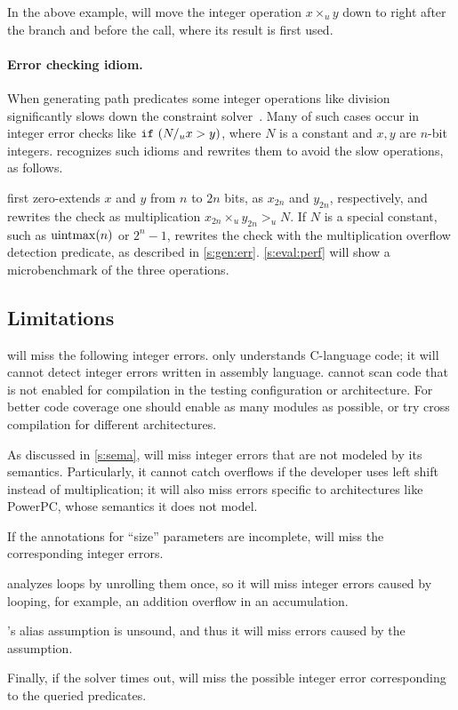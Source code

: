 In the above example, \sys will move the integer operation $x
\times_u y$ down to right after the  branch and before the
 call, where its result  is first used.

\paragraph{Error checking idiom.}

When generating path predicates some integer
operations like division significantly slows down the constraint
solver~\cite{brummayer:perf}.  Many of such cases occur in integer
error checks like $\texttt{if}\ (N /_u x > y)$, where $N$ is a constant
and $x, y$ are $n$-bit integers.  \sys recognizes such idioms and
rewrites them to avoid the slow operations, as follows.

\sys first zero-extends $x$ and $y$ from $n$ to $2n$ bits, as
$x_{2n}$ and $y_{2n}$, respectively, and rewrites the check as
multiplication $x_{2n} \times_u y_{2n} >_u N$.  If $N$ is a special
constant, such as $\operatorname{uintmax}(n)$ or $2^n-1$, \sys rewrites the check
with the multiplication overflow detection predicate, as described
in \autoref{s:gen:err}.
%
\autoref{s:eval:perf} will show a microbenchmark of the three
operations.

\subsection{Limitations}
\label{s:gen:limit}

\sys will miss the following integer errors.
%
\sys only understands C-language code; it will cannot detect integer
errors written in assembly language.
%
\sys cannot scan code that is not enabled for compilation in the
testing configuration or architecture.  For better code coverage
one should enable as many modules as possible, or try cross compilation
for different architectures.

As discussed in \autoref{s:sema}, \sys will miss integer errors
that are not modeled by its semantics.  Particularly, it cannot catch
overflows if the developer uses left shift instead of multiplication;
it will also miss errors specific to architectures like PowerPC,
whose semantics it does not model.

If the annotations for ``size'' parameters are incomplete, \sys will
miss the corresponding integer errors.

\sys analyzes loops by unrolling them once, so it will miss integer
errors caused by looping, for example, an addition overflow in an
accumulation.

\sys's alias assumption is unsound, and thus it will miss errors
caused by the assumption.

Finally, if the solver times out, \sys will miss the possible integer
error corresponding to the queried predicates.
